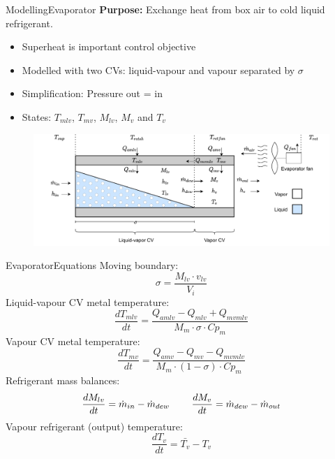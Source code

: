 \begin{frame}{Modelling}{Evaporator}
	\textbf{Purpose:} Exchange heat from box air to cold liquid refrigerant.
	\begin{itemize}
		\item Superheat is important control objective
		\item Modelled with two CVs: liquid-vapour and vapour separated by $\sigma$
		\item Simplification: Pressure out = in
		\item States: $T_{mlv}$, $T_{mv}$, $M_{lv}$, $M_{v}$ and $T_{v}$
	\end{itemize}
	
	\vspace{0.4cm}
	\begin{figure}[h!]
		\centering
		\includegraphics[width=1\textwidth]{../Graphics/Evaporator_CV_diagram.pdf}
		\label{fig:evap_CV}
	\end{figure}

\end{frame}

\begin{frame}{Evaporator}{Equations}
	Moving boundary:
	\begin{equation}
		\sigma = \frac{M_{lv} \cdot v_{lv}}{V_i} \label{eq:Evaporator_boundary}
	\end{equation}
	Liquid-vapour CV metal temperature:
	\begin{equation}
		\frac{dT_{mlv}}{dt}  = \frac{Q_{amlv}-Q_{mlv} + Q_{mvmlv}}{M_m \cdot \sigma \cdot Cp_m} \label{eq:evap_dT_ml}
	\end{equation}
	Vapour CV metal temperature:
	\begin{equation}
		\frac{dT_{mv}}{dt} = \frac{Q_{amv} - Q_{mv} - Q_{mvmlv}}{M_m \cdot (1 - \sigma) \cdot Cp_m} \label{eq:evap_dT_mv}
	\end{equation}
	Refrigerant mass balances:
	\begin{equation} \label{eq:evap_dMlv}
		\frac{dM_{lv}}{dt} = \dot{m}_{in} - \dot{m}_{dew} \hspace{0.8cm}  \frac{dM_v}{dt} = \dot{m}_{dew} - \dot{m}_{out}
	\end{equation}
	Vapour refrigerant (output) temperature:
	\begin{equation}\label{eq:tv_initial}
		\frac{dT_{v}}{dt} = \bar{T_v} - T_v
	\end{equation}

\end{frame}

